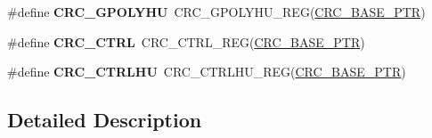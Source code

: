 \begin{DoxyCompactItemize}
\item 
\hypertarget{group___c_r_c___register___accessor___macros_ga52c0c04aaa1ae20951eeebeb1c58e96e}{}\#define {\bfseries C\+R\+C\+\_\+\+G\+P\+O\+L\+Y\+H\+U}~C\+R\+C\+\_\+\+G\+P\+O\+L\+Y\+H\+U\+\_\+\+R\+E\+G(\hyperlink{group___c_r_c___peripheral_ga139bd4056b9e3c7987d28b6e955b662d}{C\+R\+C\+\_\+\+B\+A\+S\+E\+\_\+\+P\+T\+R})\label{group___c_r_c___register___accessor___macros_ga52c0c04aaa1ae20951eeebeb1c58e96e}

\item 
\hypertarget{group___c_r_c___register___accessor___macros_gae7431cd932210c6ef38ebcd07672aa8b}{}\#define {\bfseries C\+R\+C\+\_\+\+C\+T\+R\+L}~C\+R\+C\+\_\+\+C\+T\+R\+L\+\_\+\+R\+E\+G(\hyperlink{group___c_r_c___peripheral_ga139bd4056b9e3c7987d28b6e955b662d}{C\+R\+C\+\_\+\+B\+A\+S\+E\+\_\+\+P\+T\+R})\label{group___c_r_c___register___accessor___macros_gae7431cd932210c6ef38ebcd07672aa8b}

\item 
\hypertarget{group___c_r_c___register___accessor___macros_gab3a9873d31cfc029f5c1ac6f735a798c}{}\#define {\bfseries C\+R\+C\+\_\+\+C\+T\+R\+L\+H\+U}~C\+R\+C\+\_\+\+C\+T\+R\+L\+H\+U\+\_\+\+R\+E\+G(\hyperlink{group___c_r_c___peripheral_ga139bd4056b9e3c7987d28b6e955b662d}{C\+R\+C\+\_\+\+B\+A\+S\+E\+\_\+\+P\+T\+R})\label{group___c_r_c___register___accessor___macros_gab3a9873d31cfc029f5c1ac6f735a798c}

\end{DoxyCompactItemize}


\subsection{Detailed Description}
